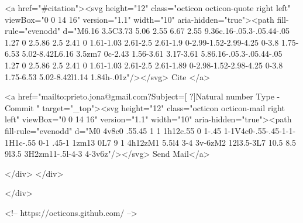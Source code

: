       <a  href="#citation"><svg height="12" class="octicon octicon-quote right left" viewBox="0 0 14 16" version="1.1" width="10" aria-hidden="true"><path fill-rule="evenodd" d="M6.16 3.5C3.73 5.06 2.55 6.67 2.55 9.36c.16-.05.3-.05.44-.05 1.27 0 2.5.86 2.5 2.41 0 1.61-1.03 2.61-2.5 2.61-1.9 0-2.99-1.52-2.99-4.25 0-3.8 1.75-6.53 5.02-8.42L6.16 3.5zm7 0c-2.43 1.56-3.61 3.17-3.61 5.86.16-.05.3-.05.44-.05 1.27 0 2.5.86 2.5 2.41 0 1.61-1.03 2.61-2.5 2.61-1.89 0-2.98-1.52-2.98-4.25 0-3.8 1.75-6.53 5.02-8.42l1.14 1.84h-.01z"/></svg> Cite
      </a>

      <a href="mailto:prieto.jona@gmail.com?Subject=[ ?]Natural number Type - Commit " target="_top"><svg height="12" class="octicon octicon-mail right left" viewBox="0 0 14 16" version="1.1" width="10" aria-hidden="true"><path fill-rule="evenodd" d="M0 4v8c0 .55.45 1 1 1h12c.55 0 1-.45 1-1V4c0-.55-.45-1-1-1H1c-.55 0-1 .45-1 1zm13 0L7 9 1 4h12zM1 5.5l4 3-4 3v-6zM2 12l3.5-3L7 10.5 8.5 9l3.5 3H2zm11-.5l-4-3 4-3v6z"/></svg> Send Mail</a>

    </div>
  </div>

</div>

<!-- https://octicons.github.com/ -->





